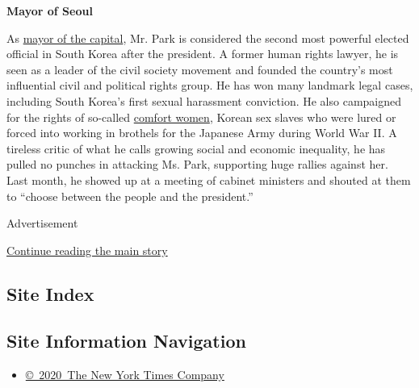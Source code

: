 \textbf{Mayor of Seoul}

As
\href{http://www.nytimes3xbfgragh.onion/2011/10/27/world/asia/vote-on-seoul-mayor-seen-as-having-wider-implications.html}{mayor
of the capital}, Mr. Park is considered the second most powerful elected
official in South Korea after the president. A former human rights
lawyer, he is seen as a leader of the civil society movement and founded
the country's most influential civil and political rights group. He has
won many landmark legal cases, including South Korea's first sexual
harassment conviction. He also campaigned for the rights of so-called
\href{http://www.nytimes3xbfgragh.onion/2015/12/29/world/asia/comfort-women-south-korea-japan.html}{comfort
women}, Korean sex slaves who were lured or forced into working in
brothels for the Japanese Army during World War II. A tireless critic of
what he calls growing social and economic inequality, he has pulled no
punches in attacking Ms. Park, supporting huge rallies against her. Last
month, he showed up at a meeting of cabinet ministers and shouted at
them to ``choose between the people and the president.''

Advertisement

\protect\hyperlink{after-bottom}{Continue reading the main story}

\hypertarget{site-index}{%
\subsection{Site Index}\label{site-index}}

\hypertarget{site-information-navigation}{%
\subsection{Site Information
Navigation}\label{site-information-navigation}}

\begin{itemize}
\tightlist
\item
  \href{https://help.nytimes3xbfgragh.onion/hc/en-us/articles/115014792127-Copyright-notice}{©~2020~The
  New York Times Company}
\end{itemize}

